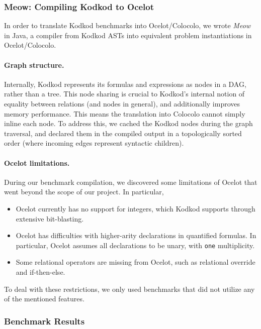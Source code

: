 \documentclass[10pt]{article}
\theoremstyle{definition}
\begin{document}
  \subsubsection{Meow: Compiling Kodkod to Ocelot}
  In order to translate Kodkod benchmarks into Ocelot/Colocolo, we wrote \emph{Meow} in Java, a compiler from Kodkod ASTs into equivalent problem instantiations in Ocelot/Colocolo.
  \paragraph{Graph structure.} Internally, Kodkod represents its formulas and expressions as nodes in a DAG, rather than a tree. This node sharing is crucial to Kodkod's internal notion of equality between relations (and nodes in general), and additionally improves memory performance. This means the translation into Colocolo cannot simply inline each node. To address this, we cached the Kodkod nodes during the graph traversal, and declared them in the compiled output in a topologically sorted order (where incoming edges represent syntactic children).

  \paragraph{Ocelot limitations.} During our benchmark compilation, we discovered some limitations of Ocelot that went beyond the scope of our project. In particular,
  \begin{itemize}
    \item Ocelot currently has no support for integers, which Kodkod supports through extensive bit-blasting.
    \item Ocelot has difficulties with higher-arity declarations in quantified formulas. In particular, Ocelot assumes all declarations to be unary, with \texttt{one} multiplicity.
    \item Some relational operators are missing from Ocelot, such as relational override and if-then-else.
  \end{itemize}
  To deal with these restrictions, we only used benchmarks that did not utilize any of the mentioned features.
  
  
  \subsubsection{Benchmark Results}
\end{document}
